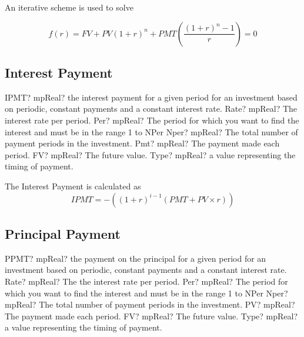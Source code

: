 An iterative scheme is used to solve

\begin{equation}
f(r) = FV + PV(1+r)^n + PMT \left( \frac{(1+r)^n-1}{r} \right) = 0
\end{equation}





\subsection{Interest Payment}

\begin{mpFunctionsExtract}
	\mpWorksheetFunctionSixNotImplemented
	{IPMT? mpReal? the interest payment for a given period for an investment based on periodic, constant payments and a constant interest rate.}
	{Rate? mpReal? The interest rate per period.}
	{Per? mpReal? The period for which you want to find the interest and must be in the range 1 to NPer}
	{Nper? mpReal? The total number of payment periods in the investment.}
	{Pmt? mpReal? The payment made each period.}
	{FV? mpReal? The future value.}
	{Type? mpReal? a value representing the timing of payment.}
\end{mpFunctionsExtract}

\vspace{0.3cm}
The Interest Payment is calculated as
\begin{equation}
IPMT = -\left( (1+r)^{i-1} (PMT + PV \times r)\right)
\end{equation}




\subsection{Principal Payment}

\begin{mpFunctionsExtract}
	\mpWorksheetFunctionSixNotImplemented
	{PPMT? mpReal? the payment on the principal for a given period for an investment based on periodic, constant payments and a constant interest rate.}
	{Rate? mpReal? The the interest rate per period.}
	{Per? mpReal? The period for which you want to find the interest and must be in the range 1 to NPer}
	{Nper? mpReal? The total number of payment periods in the investment.}
	{PV? mpReal? The payment made each period.}
	{FV? mpReal? The future value.}
	{Type? mpReal? a value representing the timing of payment.}
\end{mpFunctionsExtract}

